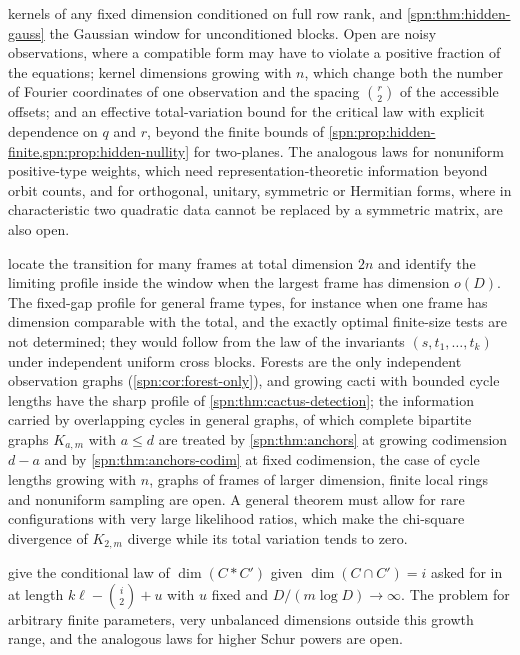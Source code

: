 \begin{question}
kernels of any fixed dimension conditioned on full row rank, and \cref{spn:thm:hidden-gauss} the
Gaussian window for unconditioned blocks. Open are noisy observations, where a compatible form may
have to violate a positive fraction of the equations; kernel dimensions growing with $n$, which change
both the number of Fourier coordinates of one observation and the spacing $\binom r2$ of the
accessible offsets; and an effective total-variation bound for the critical law with explicit
dependence on $q$ and $r$, beyond the finite bounds of
\cref{spn:prop:hidden-finite,spn:prop:hidden-nullity} for two-planes. The
analogous laws for
nonuniform positive-type weights, which need representation-theoretic information beyond orbit
counts, and for orthogonal, unitary, symmetric or Hermitian forms, where in characteristic two
quadratic data cannot be replaced by a symmetric matrix, are also open.
\end{question}

\begin{question}\label{spn:q:dependence}
 locate the transition for many frames at total
dimension $2n$ and identify the limiting profile inside the window when the largest frame has
dimension $o(D)$. The fixed-gap profile for general frame types, for instance when one frame has
dimension comparable with the total, and the exactly optimal finite-size tests are not determined;
they would follow from the law of the invariants $(s,t_1,\dots,t_k)$ under independent uniform cross
blocks. Forests are the only independent observation graphs (\cref{spn:cor:forest-only}), and growing
cacti with bounded cycle lengths have the sharp profile of \cref{spn:thm:cactus-detection}; the
information carried by overlapping cycles in general graphs, of which complete bipartite graphs
$K_{a,m}$ with $a\le d$ are treated by \cref{spn:thm:anchors} at growing codimension $d-a$ and by
\cref{spn:thm:anchors-codim} at fixed codimension, the case of cycle lengths growing with $n$, graphs of
frames of larger dimension, finite local rings and nonuniform sampling are open. A general theorem
must allow for rare configurations with very large likelihood ratios, which make the chi-square
divergence of $K_{2,m}$ diverge while its total variation tends to zero.
\end{question}

\begin{question}\label{spn:q:codes}
 give the conditional law of $\dim(C*C')$ given
$\dim(C\cap C')=i$ asked for in \cite[Problem~21]{Randriambololona2015Linear} at length
$k\ell-\binom i2+u$ with $u$ fixed and $D/(m\log D)\to\infty$. The problem for arbitrary finite
parameters, very unbalanced dimensions outside this growth range, and the analogous laws for higher
Schur powers \cite[Problem~23]{Randriambololona2015Linear} are open.
\end{question}

